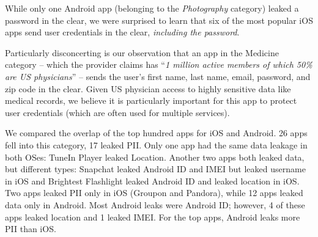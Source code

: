 While only one Android app (belonging to the \emph{Photography} category) leaked a password in the clear, 
we were surprised to learn that six of the most popular iOS apps send user 
credentials in the clear, \emph{including the password}. 

Particularly disconcerting 
is our observation that an app in the Medicine category -- which the provider claims has ``\emph{1 million active members 
of which 50\% are US physicians}'' -- sends the user's first name, last name, 
email, password, and zip code in the clear. Given US physician access to highly sensitive 
data like medical records, we believe it is particularly important for this app to protect 
user credentials (which are often used for multiple services). 

 We compared the overlap of the top hundred apps for iOS and Android. 26 apps fell into this category, 17 leaked PII. Only one app had the same data leakage in both OSes: TuneIn Player leaked Location. Another two apps both leaked data, but different types: Snapchat leaked Android ID and IMEI but leaked username in iOS and Brightest Flashlight leaked Android ID and leaked location in iOS. Two apps leaked PII only in iOS (Groupon and Pandora), while 12 apps leaked data only in Android. Most Android leaks were  Android ID; however, 4 of these apps leaked location and 1 leaked IMEI. For the top apps, Android leaks more PII than iOS.


